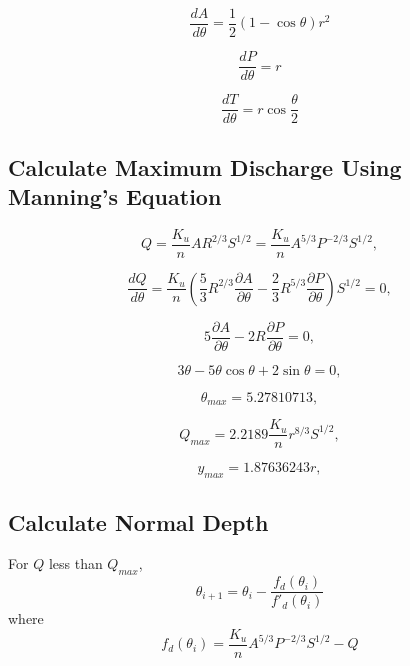 \begin{equation}
\frac{dA}{d\theta} = \frac{1}{2} (1 - \cos\theta) r^2
\end{equation}

\begin{equation}
\frac{dP}{d\theta} =  r
\end{equation}

\begin{equation}
\frac{dT}{d\theta} = r \cos \frac{\theta}{2}
\end{equation}

\subsection{Calculate Maximum Discharge Using Manning's Equation}
\begin{equation}  
Q = \frac{K_u}{n}AR^{2/3}S^{1/2} = \frac{K_u}{n}A^{5/3}P^{-2/3}S^{1/2},
\end{equation}

\begin{equation}  
\frac{dQ}{d\theta} = \frac{K_u}{n} \left(\frac{5}{3}R^{2/3}\frac{\partial A}{\partial \theta} -  \frac{2}{3}R^{5/3}\frac{\partial P}{\partial \theta} \right) S^{1/2}=0,
\end{equation}

\begin{equation}  
5\frac{\partial A}{\partial \theta} -  2 R\frac{\partial P}{\partial \theta} = 0,
\label{Eq:CircularMaxQ}
\end{equation}

\begin{equation}  
3\theta - 5\theta \cos \theta + 2 \sin \theta = 0,
\end{equation}

\begin{equation}  
\theta_{max}  = 5.27810713,
\end{equation}

\begin{equation}  
Q_{max} =  2.2189 \frac{K_u}{n} r^{8/3}S^{1/2},
\end{equation}

\begin{equation}  
y_{max}  = 1.87636243 r,
\end{equation}

\subsection{Calculate Normal Depth}
For $Q$ less than $Q_{max}$,
\begin{equation}  
\theta_{i+1} = \theta_i -\frac{f_d(\theta_{i})}{f'_d(\theta_{i})}
\end{equation}
where
\begin{equation}  
f_d(\theta_{i})= \frac{K_u}{n}A^{5/3}P^{-2/3}S^{1/2} - Q 
\end{equation}

